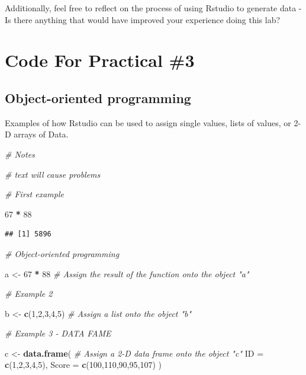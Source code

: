 \documentclass[
]{book}
\newenvironment{Shaded}{\begin{snugshade}}{\end{snugshade}}
\newcommand{\AttributeTok}[1]{\textcolor[rgb]{0.13,0.29,0.53}{#1}}
\newcommand{\CommentTok}[1]{\textcolor[rgb]{0.56,0.35,0.01}{\textit{#1}}}
\newcommand{\DecValTok}[1]{\textcolor[rgb]{0.00,0.00,0.81}{#1}}
\newcommand{\FunctionTok}[1]{\textcolor[rgb]{0.13,0.29,0.53}{\textbf{#1}}}
\newcommand{\NormalTok}[1]{#1}
\newcommand{\OtherTok}[1]{\textcolor[rgb]{0.56,0.35,0.01}{#1}}
\newcommand{\SpecialCharTok}[1]{\textcolor[rgb]{0.81,0.36,0.00}{\textbf{#1}}}
\begin{document}
Additionally, feel free to reflect on the process of using Rstudio to generate data - Is there anything that would have improved your experience doing this lab?

\section*{Code For Practical \#3}\label{code-for-practical-3}

\subsection*{Object-oriented programming}\label{object-oriented-programming}

Examples of how Rstudio can be used to assign single values, lists of values, or 2-D arrays of Data.

\begin{Shaded}
\begin{Highlighting}[]
\CommentTok{\# Notes }

\CommentTok{\# text will cause problems }

\CommentTok{\# First example }

\DecValTok{67} \SpecialCharTok{*} \DecValTok{88}
\end{Highlighting}
\end{Shaded}

\begin{verbatim}
## [1] 5896
\end{verbatim}

\begin{Shaded}
\begin{Highlighting}[]
\CommentTok{\# Object{-}oriented programming }

\NormalTok{a }\OtherTok{\textless{}{-}} \DecValTok{67} \SpecialCharTok{*} \DecValTok{88} \CommentTok{\# Assign the result of the function onto the object "a"}

\CommentTok{\# Example 2 }

\NormalTok{b }\OtherTok{\textless{}{-}} \FunctionTok{c}\NormalTok{(}\DecValTok{1}\NormalTok{,}\DecValTok{2}\NormalTok{,}\DecValTok{3}\NormalTok{,}\DecValTok{4}\NormalTok{,}\DecValTok{5}\NormalTok{) }\CommentTok{\# Assign a list onto the object "b"}

\CommentTok{\# Example 3 {-} DATA FAME }

\NormalTok{c }\OtherTok{\textless{}{-}} \FunctionTok{data.frame}\NormalTok{( }\CommentTok{\# Assign a 2{-}D data frame onto the object "c"}
  \AttributeTok{ID =} \FunctionTok{c}\NormalTok{(}\DecValTok{1}\NormalTok{,}\DecValTok{2}\NormalTok{,}\DecValTok{3}\NormalTok{,}\DecValTok{4}\NormalTok{,}\DecValTok{5}\NormalTok{), }
  \AttributeTok{Score =} \FunctionTok{c}\NormalTok{(}\DecValTok{100}\NormalTok{,}\DecValTok{110}\NormalTok{,}\DecValTok{90}\NormalTok{,}\DecValTok{95}\NormalTok{,}\DecValTok{107}\NormalTok{)}
\NormalTok{)}
\end{Highlighting}
\end{Shaded}
\end{document}
